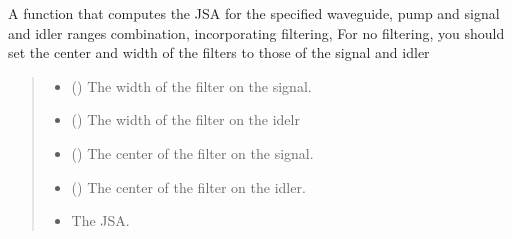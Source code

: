 \documentclass[a4paper,10pt,english]{sphinxmanual}
\begin{document}
\begin{fulllineitems}
\begin{fulllineitems}
\begin{quote}
\begin{description}
\end{description}\end{quote}

\end{fulllineitems}


\begin{fulllineitems}
\label{\detokenize{experiment:pyjsa.experiment.Experiment.joint_spectral_amplitude}}
\pysigstartsignatures
{}
\pysigstopsignatures
\sphinxAtStartPar
A function that computes the JSA for the specified waveguide, pump and signal and idler ranges combination, incorporating filtering, For no filtering, you should set the center and width of the filters to those of the signal and idler
\begin{quote}\begin{description}
\begin{itemize}
\item {} 
\sphinxAtStartPar
{} () \textendash{} The width of the filter on the signal.

\item {} 
\sphinxAtStartPar
{} () \textendash{} The width of the filter on the idelr

\item {} 
\sphinxAtStartPar
{} () \textendash{} The center of the filter on the signal.

\item {} 
\sphinxAtStartPar
{} () \textendash{} The center of the filter on the idler.

\end{itemize}

\sphinxAtStartPar
\begin{itemize}
\item {} 
\sphinxAtStartPar
{} \textendash{} The JSA.


\end{itemize}
\end{description}
\end{quote}
\end{fulllineitems}
\end{fulllineitems}
\end{document}
